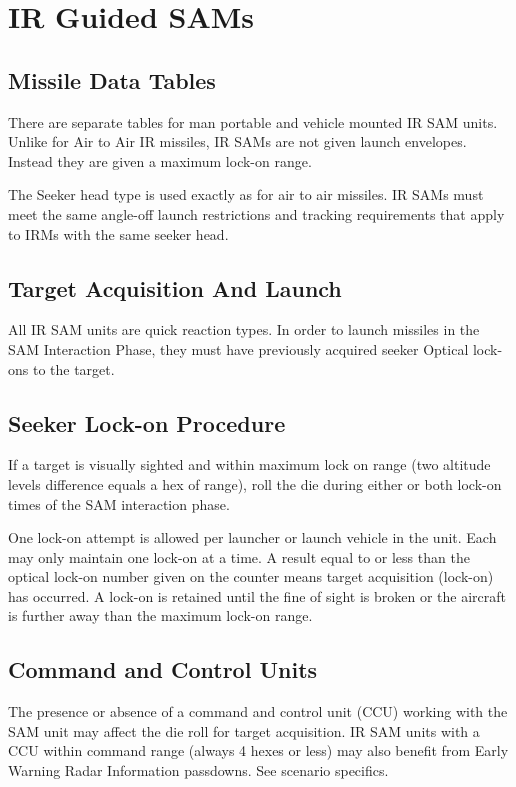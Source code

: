 \section{IR Guided SAMs}

\subsection{Missile Data Tables} There are separate tables for man portable and vehicle mounted IR SAM units. Unlike for Air to Air IR missiles, IR SAMs are not given launch envelopes. Instead they are given a maximum lock-on range.

The Seeker head type is used exactly as for air to air missiles. IR SAMs must meet the same angle-off launch restrictions and tracking requirements that apply to IRMs with the same seeker head.

\subsection{Target Acquisition And Launch} All IR SAM units are quick reaction types. In order to launch missiles in the SAM Interaction Phase, they must have previously acquired seeker Optical lock-ons to the target.

\subsection{Seeker Lock-on Procedure}

If a target is visually sighted and within maximum lock on range (two altitude levels difference equals a hex of range), roll the die during either or both lock-on times of the SAM interaction phase.

One lock-on attempt is allowed per launcher or launch vehicle in the unit. Each may only maintain one lock-on at a time. A result equal to or less than the optical lock-on number given on the counter means target acquisition (lock-on) has occurred. A lock-on is retained until the fine of sight is broken or the aircraft is further away than the maximum lock-on range.

\subsection{Command and Control Units} The presence or absence of a command and control unit (CCU) working with the SAM unit may affect the die roll for target acquisition. IR SAM units with a CCU within command range (always 4 hexes or less) may also benefit from Early Warning Radar Information passdowns. See scenario specifics.

